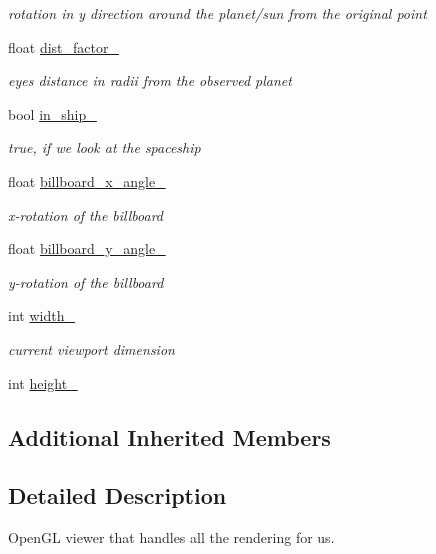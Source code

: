 \begin{DoxyCompactItemize}
\begin{DoxyCompactList}\small\item\em rotation in y direction around the planet/sun from the original point \end{DoxyCompactList}\item 
float \hyperlink{classSolar__viewer_a7447e4773978c9391a2ab54a52b92b43}{dist\+\_\+factor\+\_\+}
\begin{DoxyCompactList}\small\item\em eye\textquotesingle{}s distance in radii from the observed planet \end{DoxyCompactList}\item 
bool \hyperlink{classSolar__viewer_a6bed73dabfc1ef5dbf51b1bf6b854a55}{in\+\_\+ship\+\_\+}
\begin{DoxyCompactList}\small\item\em true, if we look at the spaceship \end{DoxyCompactList}\item 
float \hyperlink{classSolar__viewer_adf92f5eeae577e1178a4e8216abb87bb}{billboard\+\_\+x\+\_\+angle\+\_\+}
\begin{DoxyCompactList}\small\item\em x-\/rotation of the billboard \end{DoxyCompactList}\item 
float \hyperlink{classSolar__viewer_af91dd8490128e7b955fee3a166db7c3f}{billboard\+\_\+y\+\_\+angle\+\_\+}
\begin{DoxyCompactList}\small\item\em y-\/rotation of the billboard \end{DoxyCompactList}\item 
int \hyperlink{classSolar__viewer_ad12592d718e123912365df3ef23a2dbb}{width\+\_\+}
\begin{DoxyCompactList}\small\item\em current viewport dimension \end{DoxyCompactList}\item 
int \hyperlink{classSolar__viewer_ae13eeec65d2a4ea4fda382687a4379cd}{height\+\_\+}
\end{DoxyCompactItemize}
\subsection*{Additional Inherited Members}


\subsection{Detailed Description}
Open\+GL viewer that handles all the rendering for us. 

